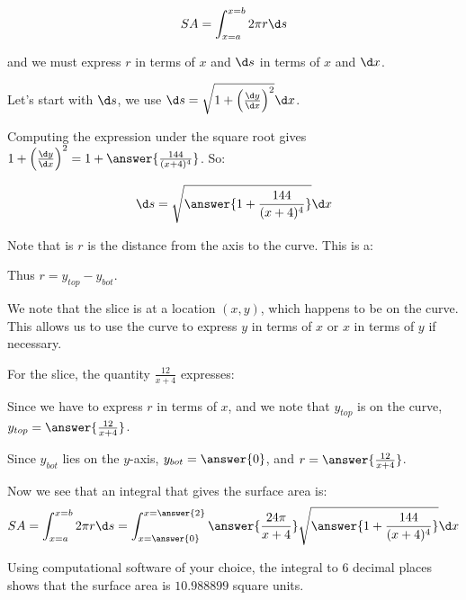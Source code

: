 \documentclass{ximera}
\begin{document}
\begin{exercise}
\[ SA = \int_{x=a}^{x=b} 2 \pi r \d s\]

and we must express $r$ in terms of $x$ and $\d s$ in terms of $x$ and $\d x$.  


Let's start with $\d s$, we use $\d s = \sqrt{1+\left(\frac{\d y}{\d x}\right)^2} \d x$.

Computing the expression under the square root gives $1+\left(\frac{\d y}{\d x}\right)^2 = 1+\answer{\frac{144}{(x+4)^4}}$.  So: 

\[
\d s = \sqrt{\answer{1+\frac{144}{(x+4)^4}}} \d x
\]


\begin{exercise}
Note that is $r$ is the distance from the axis to the curve. This is a:

\begin{multipleChoice}
\end{multipleChoice} 
Thus $r=y_{top}-y_{bot}$.  

We note that the slice is at a location $(x,y)$, which happens to be on the curve.  This allows us to use the curve to express $y$ in terms of $x$ or $x$ in terms of $y$ if necessary.  

For the slice, the quantity $\frac{12}{x+4}$ expresses:
\begin{multipleChoice}
\end{multipleChoice} 

Since we have to express $r$ in terms of $x$, and we note that $y_{top}$ is on the curve, $y_{top} = \answer{\frac{12}{x+4}}$.

Since $y_{bot}$ lies on the $y$-axis, $y_{bot} = \answer{0}$, and $r= \answer{\frac{12}{x+4}}$.

\end{exercise}

\begin{exercise}
Now we see that an integral that gives the surface area is: 
\[
SA= \int_{x=a}^{x=b} 2 \pi r \d s = \int_{x=\answer{0}}^{x=\answer{2}} \answer{\frac{24\pi}{x+4}} \sqrt{\answer{1+\frac{144}{(x+4)^4}}} \d x
\]

Using computational software of your choice, the integral to 6 decimal places shows that the surface area is $10.988899$ square units. 
\end{exercise}



\end{exercise}
\end{document}
